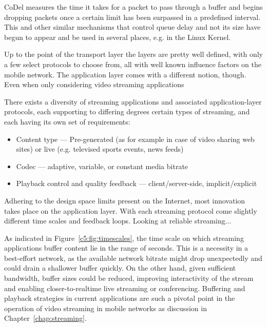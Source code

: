 CoDel measures the time it takes for a packet to pass through a buffer and begins dropping packets once a certain limit has been surpassed in a predefined interval. This and other similar mechanisms that control queue delay and not its size have begun to appear and be used in several places, e.g. in the Linux Kernel.



Up to the point of the transport layer the layers are pretty well defined, with only a few select protocols to choose from, all with well known influence factors on the mobile network. The application layer comes with a different notion, though. Even when only considering video streaming applications



There exists a diversity of streaming applications and associated application-layer protocols, each supporting to differing degrees certain types of streaming, and each having its own set of requirements:
\begin{itemize}
\item Content type --- Pre-generated (as for example in case of video sharing web sites) or live (e.g. televised sports events, news feeds)
\item Codec --- adaptive, variable, or constant media bitrate
\item Playback control and quality feedback --- client/server-side, implicit/explicit
\end{itemize}
Adhering to the design space limits present on the Internet, most innovation takes place on the application layer.
With each streaming protocol come slightly different time scales and feedback loops. Looking at reliable streaming...



As indicated in Figure~\ref{c5:fig:timescales}, the time scale on which streaming applications buffer content lie in the range of seconds. This is a necessity in a best-effort network, as the available network bitrate might drop unexpectedly and could drain a shallower buffer quickly. On the other hand, given sufficient bandwidth, buffer sizes could be reduced, improving interactivity of the stream and enabling closer-to-realtime live streaming or conferencing.
Buffering and playback strategies in current applications are such a pivotal point in the operation of video streaming in mobile networks as discussion in Chapter~\ref{chap:streaming}.

